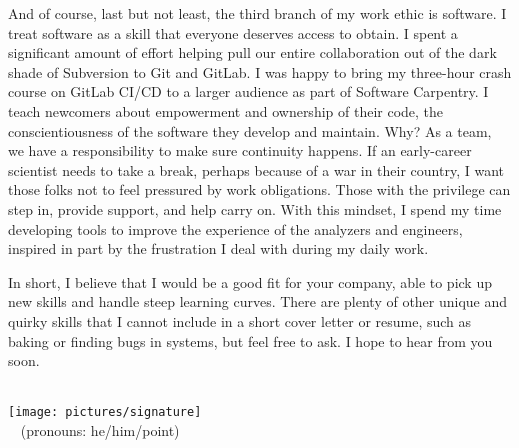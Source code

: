 \documentclass[10pt,letterpaper,sans]{moderncv} %
\makeatletter
\renewcommand*{\makeletterclosing}{
  \@closing\\[0.5em]%
  \texttt{[image: pictures/signature]}\\%
  {\bfseries \@firstname~\@lastname} (pronouns: he/him/point)%
  \ifthenelse{\isundefined{\@enclosure}}{}{%
    \\%
    \vfill%
    {\color{color2}\itshape\enclname: \@enclosure}}}
\makeatother
\begin{document}
And of course, last but not least, the third branch of my work ethic is software. I treat software as a skill that everyone deserves access to obtain. I spent a significant amount of effort helping pull our entire collaboration out of the dark shade of Subversion to Git and GitLab. I was happy to bring my three-hour crash course on GitLab CI/CD to a larger audience as part of Software Carpentry. I teach newcomers about empowerment and ownership of their code, the conscientiousness of the software they develop and maintain. Why? As a team, we have a responsibility to make sure continuity happens. If an early-career scientist needs to take a break, perhaps because of a war in their country, I want those folks not to feel pressured by work obligations. Those with the privilege can step in, provide support, and help carry on. With this mindset, I spend my time developing tools to improve the experience of the analyzers and engineers, inspired in part by the frustration I deal with during my daily work.

In short, I believe that I would be a good fit for your company, able to pick up new skills and handle steep learning curves. There are plenty of other unique and quirky skills that I cannot include in a short cover letter or resume, such as baking or finding bugs in systems, but feel free to ask. I hope to hear from you soon.

\makeletterclosing
\end{document}
